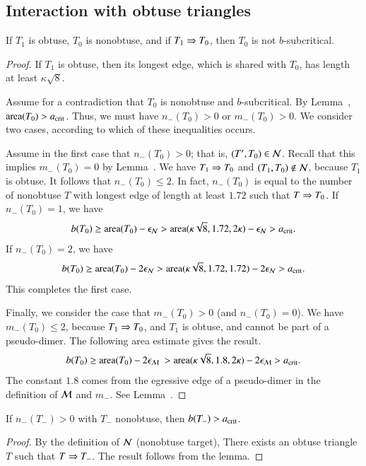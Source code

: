 \subsection{Interaction with obtuse triangles}

\begin{lemma}
  If $T_1$ is obtuse, $T_0$ is nonobtuse, and if $T_1 \Rightarrow T_0$, then
  $T_0$ is not $b$-subcritical.
\end{lemma}

\begin{proof} 
  If $T_1$ is obtuse, then its longest edge, which is shared with
  $T_0$, has length at least $\kappa\sqrt8$.

  Assume for a contradiction that $T_0$ is nonobtuse and
  $b$-subcritical.  By Lemma~, ${\operatorname{area}}(T_0) > a_\text{crit}$.
  Thus, we must have $n_-(T_0)>0$ or $m_-(T_0)>0$.  We consider two
  cases, according to which of these inequalities occurs.

  Assume in the first case that $n_-(T_0)>0$; that is, $(T',T_0)\in
  \mathcal N$.  Recall that this implies $m_-(T_0)=0$ by
  Lemma~.  We have $T_1\Rightarrow T_0$ and $(T_1,T_0)\not\in
  \mathcal N$, because $T_1$ is obtuse.  It follows that $n_-(T_0)\le 2$.  In
  fact, $n_-(T_0)$ is equal to the number of nonobtuse $T$ with
  longest edge of length at least $1.72$ such that $T\Rightarrow T_0$.  If
  $n_-(T_0)=1$, we have
  \[
b(T_0) \ge {\operatorname{area}}(T_0) - \epsilon_{\mathcal N} 
> {\operatorname{area}}(\kappa\sqrt8,1.72,2\kappa)  - \epsilon_{\mathcal N} > a_\text{crit}.
\]
If $n_-(T_0)=2$, we have
  \[
b(T_0) \ge {\operatorname{area}}(T_0) - 2\epsilon_{\mathcal N} 
> {\operatorname{area}}(\kappa\sqrt8,1.72,1.72)  - 2\epsilon_{\mathcal N} > a_\text{crit}.
\]
  This completes the first case.

  Finally, we consider the case that $m_-(T_0)>0$ (and $n_-(T_0)=0$).
  We have $m_-(T_0)\le 2$, because $T_1\Rightarrow T_0$, and $T_1$ is obtuse,
  and cannot be part of a pseudo-dimer.  The following area estimate
  gives the result.
\[
  b(T_0) \ge \area(T_0) - 2\epsM\ 
  > \area(\kappa\sqrt8,1.8,2\kappa) -
  2\epsM > \acrit.
\]
The constant $1.8$ comes from the egressive edge of a pseudo-dimer in
the definition of $\mathcal M$ and $m_-$.  See Lemma~\rif{calc:pseudo2}.
\end{proof}

\begin{corollary} 
  If $n_-(T_-)>0$ with $T_-$ nonobtuse, then $b(T_-) > a_\text{crit}$.
\end{corollary}  

\begin{proof}  
  By the definition of $\mathcal N$ (nonobtuse target), There exists an obtuse
  triangle $T$ such that $T\Rightarrow T_-$.  The result follows from the
  lemma.
\end{proof}

